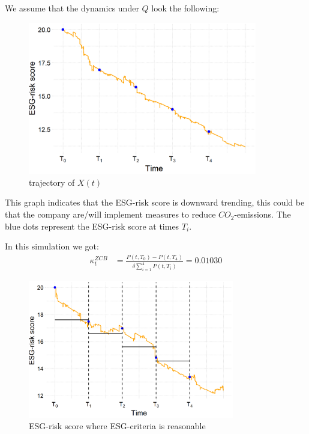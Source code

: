 We assume that the dynamics under $Q$ look the following: 
\begin{figure}[htp]
    \centering
    \includegraphics[width=10cm]{figures/ESG/ESG_OU_path.png}
    \caption{trajectory of $X(t)$}
    \label{fig: ESG-risk score}
\end{figure}

This graph indicates that the ESG-risk score is downward trending, this could be that the company are/will implement measures to reduce $CO_{2}$-emissions.
The blue dots represent the ESG-risk score at times $T_{i}$. 


\newpage 

In this simulation we got: 
\begin{align*}
\kappa_{t}^{ZCB} &= \frac{P(t,T_{0})-P(t,T_{4})}{\delta \sum_{i=1}^{4}P(t,T_{i})} = 0.01030   
\end{align*}

\begin{figure}[htp]
    \centering
    \includegraphics[width= 9cm]{figures/ESG/ESG_plt_criteria.png}
    \caption{ESG-risk score where ESG-criteria is reasonable}
    \label{fig: ESG-risk_criteria1}
\end{figure}

